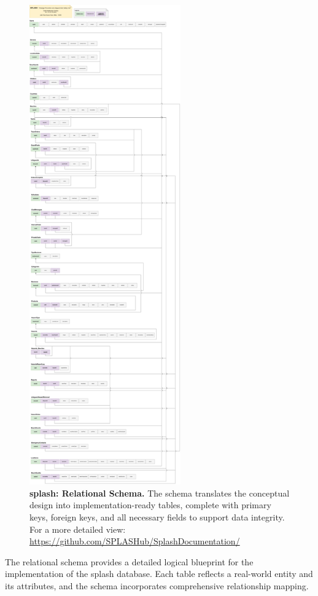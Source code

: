 \begin{figure}[H]
    \centering
    \includegraphics[width=6.5cm]{figs/Relational_Schema.png}
    \caption{\textbf{\ac{splash}: Relational Schema.} The schema translates the conceptual design into implementation-ready tables, complete with primary keys, foreign keys, and all necessary fields to support data integrity. For a more detailed view: \url{https://github.com/SPLASHub/SplashDocumentation/}}
    \label{fig:Relational_Schema}
\end{figure}

The relational schema provides a detailed logical blueprint for the implementation of the \ac{splash} database. Each table reflects a real-world entity and its attributes, and the schema incorporates comprehensive relationship mapping.

